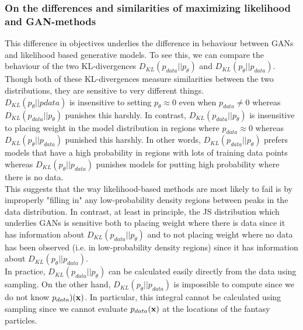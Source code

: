 \subsubsection{On the differences and similarities of maximizing likelihood and GAN-methods}
This difference in objectives underlies the difference in behaviour between GANs and likelihood based generative models. To see this, we can compare the behaviour of the two KL-divergences $D_{KL}(p_{data}||p_\theta)$ and $D_{KL}(p_\theta ||p_{data})$. Though both of these KL-divergences measure similarities between the two distributions, they are sensitive to very different things.
\\
$D_{KL}(p_\theta ||p{data})$ is insensitive to setting $p_\theta \approx 0$ even when $p_{data}\neq 0$ whereas $D_{KL}(p_{data}||p_\theta)$ punishes this harshly. In contrast, $D_{KL}(p_{data}||p_\theta)$ is insensitive to placing weight in the model distribution in regions where $p_{data}\approx 0$ whereas $D_{KL}(p_\theta||p_{data})$ punished this harshly. In other words, $D_{KL}(p_{data}||p_\theta)$ prefers models that have a high probability in regions with lots of training data points whereas $D_{KL}(p_\theta || p_{data})$ punishes models for putting high probability where there is no data.\\
This suggests that the way likelihood-based methods are most likely to fail is by improperly "filling in" any low-probability density regions between peaks in the data distribution. In contrast, at least in principle, the JS distribution which underlies GANs is sensitive both to placing weight where there is data since it has information about $D_{KL}(p_{data}||p_\theta)$ and to not placing weight where no data has been observed (i.e. in low-probability density regions) since it has information about $D_{KL}(p_\theta||p_{data})$.\\
In practice, $D_{KL}(p_{data}||p_\theta)$ can be calculated easily directly from the data using sampling. On the other hand, $D_{KL}(p_\theta ||p_{data})$ is impossible to compute since we do not know $p_{data})(\mathbf{x})$. In particular, this integral cannot be calculated using sampling since we cannot evaluate $p_{data}(\mathbf{x})$ at the locations of the fantasy particles. 
